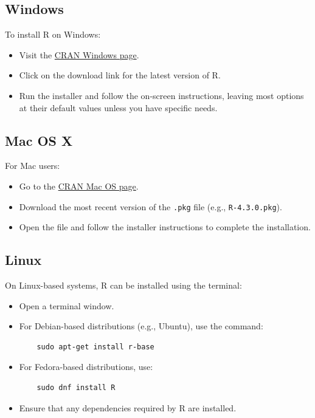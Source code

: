 \documentclass[12pt]{book}
\begin{document}
\subsection{Windows}
To install R on Windows:
\begin{itemize}
    \item Visit the \href{https://cran.r-project.org/bin/windows/base/}{CRAN Windows page}.
    \item Click on the download link for the latest version of R.
    \item Run the installer and follow the on-screen instructions, leaving most options at their default values unless you have specific needs.
\end{itemize}

\subsection{Mac OS X}
For Mac users:
\begin{itemize}
    \item Go to the \href{https://cran.r-project.org/bin/macosx/}{CRAN Mac OS page}.
    \item Download the most recent version of the \texttt{.pkg} file (e.g., \texttt{R-4.3.0.pkg}).
    \item Open the file and follow the installer instructions to complete the installation.
\end{itemize}

\subsection{Linux}
On Linux-based systems, R can be installed using the terminal:
\begin{itemize}
    \item Open a terminal window.
    \item For Debian-based distributions (e.g., Ubuntu), use the command:
    \begin{verbatim}
    sudo apt-get install r-base
    \end{verbatim}
    \item For Fedora-based distributions, use:
    \begin{verbatim}
    sudo dnf install R
    \end{verbatim}
    \item Ensure that any dependencies required by R are installed.
\end{itemize}
\end{document}
